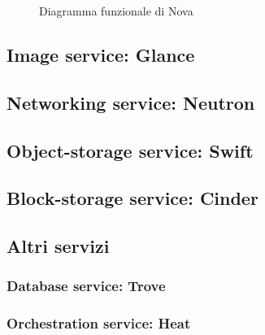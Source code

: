 \begin{figure}[H]
\centering
{}
\caption{Diagramma funzionale di Nova\cite{openstacknova}}\label{openstacknova}
\end{figure}

\subsection{Image service: Glance}

\subsection{Networking service: Neutron}
\subsection{Object-storage service: Swift}
\subsection{Block-storage service: Cinder}
\subsection{Altri servizi} 
\subsubsection{Database service: Trove}
\subsubsection{Orchestration service: Heat}
